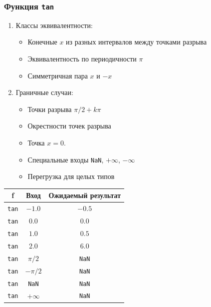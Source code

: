 \documentclass[12pt,a4paper]{report}
\begin{document}
\subsubsection*{Функция \texttt{tan}}
\begin{enumerate}
    \item Классы эквивалентности:
          \begin{itemize}
              \item Конечные $x$ из разных интервалов между точками разрыва
              \item Эквивалентность по периодичности $\pi$
              \item Симметричная пара $x$ и $-x$
          \end{itemize}
    \item Граничные случаи:
          \begin{itemize}
              \item Точки разрыва $\pi/2 + k\pi$
              \item Окрестности точек разрыва
              \item Точка $x=0$.
              \item Специальные входы \texttt{NaN}, $+\infty$, $-\infty$
              \item Перегрузка для целых типов
          \end{itemize}
\end{enumerate}
\begin{center}
    \begin{tabular}{|c|c|c|}
        \hline
        \textbf{f} & \textbf{Вход} & \textbf{Ожидаемый результат} \\
        \hline
        \texttt{tan} & $-1.0$ & $-0.5$ \\
        \hline
        \texttt{tan} & $0.0$ & $0.0$ \\
        \hline
        \texttt{tan} & $1.0$ & $0.5$ \\
        \hline
        \texttt{tan} & $2.0$ & $6.0$ \\
        \hline
        \texttt{tan} & $\pi/2$ & \texttt{NaN} \\
        \hline
        \texttt{tan} & $-\pi/2$ & \texttt{NaN} \\
        \hline
        \texttt{tan} & \texttt{NaN} & \texttt{NaN} \\
        \hline
        \texttt{tan} & $+\infty$ & \texttt{NaN} \\
        \hline
    \end{tabular}
\end{center}
\end{document}
